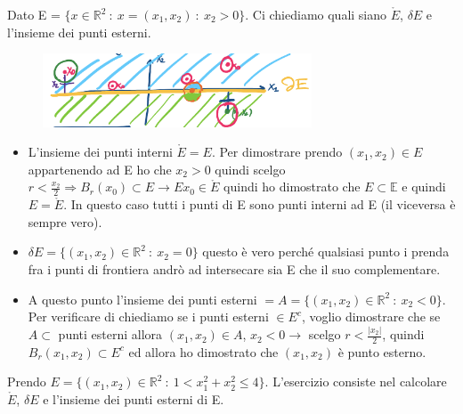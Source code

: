 \begin{example}
Dato E = $\{x \in \mathbb{R}^2 \::\: x = (x_1, x_2) \::\: x_2> 0 \}$. Ci chiediamo quali siano $\mathring{E}$, $\delta E$ e l'insieme dei punti esterni.
\end{example}

\begin{figure}[h!]
    \centering
    \vspace{-10pt}
    \includegraphics[width=8cm]{images/ess-punti-interni.png}
\end{figure}

\vspace{-10pt}
\begin{itemize}
    \item L'insieme dei punti interni $\mathring{E} = E$. Per dimostrare prendo $(x_1, x_2) \in E$ appartenendo ad E ho che $x_2 > 0$ quindi scelgo $r < \frac{x_2}{2} \Longrightarrow B_r(x_0) \subset E \rightarrow E x_0 \in \mathring{E}$ quindi ho dimostrato che $E \subset \mathbb{E}$ e quindi $E = \mathring{E}$. In questo caso tutti i punti di E sono punti interni ad E (il viceversa è sempre vero).
    \item $\delta E = \{(x_1, x_2) \in \mathbb{R}^2 \::\: x_2 = 0\}$ questo è vero perché qualsiasi punto i prenda fra i punti di frontiera andrò ad intersecare sia E che il suo complementare. 
    \item A questo punto l'insieme dei punti esterni $= A = \{(x_1, x_2) \in \mathbb{R}^2 \::\: x_2 < 0\}$. Per verificare di chiediamo se i punti esterni $\in E^c$, voglio dimostrare che se $A \subset$ punti esterni allora $(x_1, x_2) \in A$, $x_2 < 0 \rightarrow$ scelgo $r < \frac{|x_2|}{2}$, quindi $B_r (x_1, x_2)\subset E^c$ ed allora ho dimostrato che $(x_1, x_2)$ è punto esterno. 
\end{itemize}

\begin{example}
Prendo $E = \{(x_1, x_2) \in \mathbb{R}^2 \::\: 1 < x_1^2 + x_2^2 \leq 4\}$. L'esercizio consiste nel calcolare $\mathring{E}$, $\delta E$ e l'insieme dei punti esterni di E.
\end{example}

